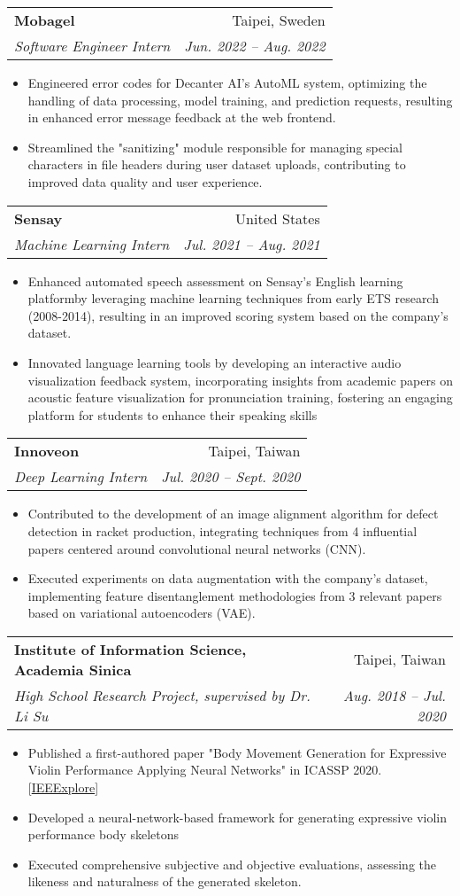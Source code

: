 \documentclass[letterpaper,11pt]{article}
\makeatletter
\newcommand{\resumeItem}[1]{
  \item\small{#1}
}
\newcommand{\resumeSubheading}[4]{
  \vspace{-1pt}\item
    \begin{tabular*}{0.97\textwidth}[t]{l@{\extracolsep{\fill}}r}
      \textbf{#1} & #2 \\
      \textit{\small#3} & \textit{\small #4} \\
    \end{tabular*}\vspace{-5pt}
}
\newcommand{\resumeItemListStart}{\begin{itemize}}
\newcommand{\resumeItemListEnd}{\end{itemize}\vspace{-5pt}}
\makeatother
\begin{document}
    \resumeSubheading
      {Mobagel}{Taipei, Sweden}
      {Software Engineer Intern}{Jun. 2022 -- Aug. 2022}
      \resumeItemListStart
        \resumeItem{}{Engineered error codes for Decanter AI's AutoML system, optimizing the handling of data processing, model training, and prediction requests, resulting in enhanced error message feedback at the web frontend.}
        \resumeItem{}{Streamlined the "sanitizing" module responsible for managing special characters in file headers during user dataset uploads, contributing to improved data quality and user experience.}
      \resumeItemListEnd

    \resumeSubheading
      {Sensay}{United States}
      {Machine Learning Intern}{Jul. 2021 -- Aug. 2021}
      \resumeItemListStart
        \resumeItem{}{Enhanced automated speech assessment on Sensay's English learning platformby leveraging machine learning techniques from early ETS research (2008-2014), resulting in an improved scoring system based on the company's dataset.}
        \resumeItem{}{Innovated language learning tools by developing an interactive audio visualization feedback system, incorporating insights from academic papers on acoustic feature visualization for pronunciation training, fostering an engaging platform for students to enhance their speaking skills}
      \resumeItemListEnd
    
      \resumeSubheading
        {Innoveon}{Taipei, Taiwan}
        {Deep Learning Intern}{Jul. 2020 -- Sept. 2020}
        \resumeItemListStart
          \resumeItem{}{Contributed to the development of an image alignment algorithm for defect detection in racket production, integrating techniques from 4 influential papers centered around convolutional neural networks (CNN).}
          \resumeItem{}{Executed experiments on data augmentation with the company's dataset, implementing feature disentanglement methodologies from 3 relevant papers based on variational autoencoders (VAE).}
        \resumeItemListEnd
      
        \resumeSubheading
          {Institute of Information Science, Academia Sinica}{Taipei, Taiwan}
          {High School Research Project, supervised by Dr. Li Su} {Aug. 2018 -- Jul. 2020}
          \resumeItemListStart
            \resumeItem{}{Published a first-authored paper "Body Movement Generation for Expressive Violin Performance Applying Neural Networks" in ICASSP 2020. [\href{https://ieeexplore.ieee.org/document/9054463}{IEEExplore}]}
            \resumeItem{}{Developed a neural-network-based framework for generating expressive violin performance body skeletons}
            \resumeItem{}{Executed comprehensive subjective and objective evaluations, assessing the likeness and naturalness of the generated skeleton.}
          \resumeItemListEnd
          
\end{document}

